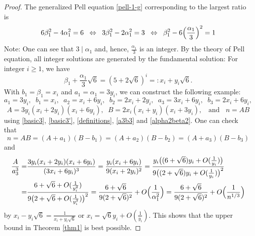 \documentclass[12pt]{article}
\begin{document}
\begin{proof}
The generalized Pell equation \eqref{pell-1-g} corresponding to the largest ratio is
\[
6 \beta_1^2 - 4 \alpha_1^2 = 6 \; \; \Leftrightarrow \; \; 3 \beta_1^2 - 2 \alpha_1^2 = 3 \; \; \Leftrightarrow \; \; \beta_1^2 - 6 \Bigl( \frac{\alpha_1}{3} \Bigr)^2 = 1
\]
Note: One can see that $3 \mid \alpha_1$ and, hence, $\frac{\alpha_1}{3}$ is an integer. By the theory of Pell equation, all integer solutions are generated by the fundamental solution: For integer $i \ge 1$, we have
\[
\beta_1 + \frac{\alpha_1}{3} \sqrt{6} = (5 + 2 \sqrt{6})^i =: x_i + y_i \sqrt{6}.
\]
With $b_1 = \beta_1 = x_i$ and $a_1 = \alpha_1 = 3 y_i$, we can construct the following example:
\[
a_1 = 3 y_i, \; \; b_1 = x_i, \; \; a_2 = x_i + 6 y_i, \; \; b_2 = 2 x_i + 2 y_i, \; \; a_3 = 3 x_i + 6 y_i, \; \; b_3 = 2 x_i + 6 y_i,
\]
\[
A = 3 y_i (x_i + 2 y_i) (x_i + 6 y_i), \; \; B = 2 x_i (x_i + y_i) (x_i + 3 y_i), \; \; \text{ and } \; \; n = A B
\]
using \eqref{basic3}, \eqref{basic3'}, \eqref{definitions}, \eqref{a3b3} and \eqref{alpha2beta2}. One can check that
\[
n = A B = (A + a_1) (B - b_1) = (A + a_2) (B - b_2) = (A + a_3) (B - b_3)
\]
and
\begin{align*}
\frac{A}{a_3^3} =& \frac{3 y_i (x_i + 2 y_i) (x_i + 6 y_i)}{(3 x_i + 6 y_i)^3} = \frac{y_i (x_i + 6 y_i)}{9 (x_i + 2 y_i)^2} = \frac{y_i \bigl( (6 + \sqrt{6}) y_i + O(\frac{1}{y_i}) \bigr)}{9 \bigl( (2 + \sqrt{6}) y_i + O(\frac{1}{y_i}) \bigr)^2} \\
=& \frac{ 6 + \sqrt{6} + O( \frac{1}{y_i^2} )}{9 \bigl( 2 + \sqrt{6} + O( \frac{1}{y_i^2} ) \bigr)^2} = \frac{6 + \sqrt{6}}{9 (2 + \sqrt{6})^2} + O \Bigl( \frac{1}{\alpha_1^2} \Bigr) = \frac{6 + \sqrt{6}}{9 (2 + \sqrt{6})^2} + O \Bigl( \frac{1}{n^{1/3}} \Bigr)
\end{align*}
by $x_i - y_i \sqrt{6} = \frac{1}{x_i + y_i \sqrt{6}}$ or $x_i = \sqrt{6} y_i + O(\frac{1}{y_i})$. This shows that the upper bound in Theorem \ref{thm1} is best possible.
\end{proof}

\end{document}
